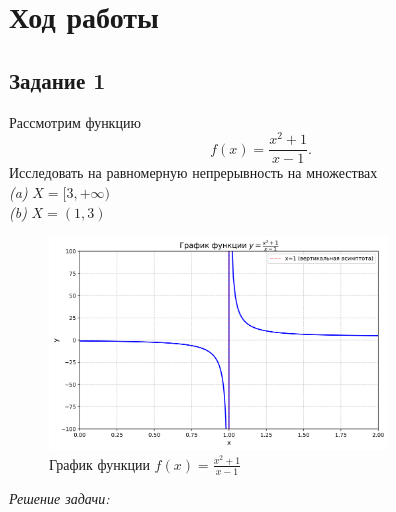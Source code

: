 \documentclass[a4paper,12pt]{article}
\begin{document}
\section{Ход работы}

\subsection{Задание 1}

Рассмотрим функцию
\[
f(x) = \frac{x^2 + 1}{x - 1}.
\]
Исследовать на равномерную непрерывность на множествах\\
\emph{(a)} \( X = [3, +\infty) \) \\
\emph{(b)} \( X = (1, 3) \)\\

\begin{figure}[h] %
    \centering %
    \includegraphics[width=0.8\textwidth]{img/task1_graph.png} %
    \caption{График функции \( f(x) = \frac{x^2 + 1}{x - 1} \)}
    \label{fig:graph}
\end{figure}
\emph{Решение задачи:}
\end{document}
